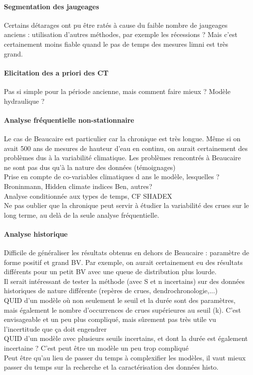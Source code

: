 	\paragraph{Segmentation des jaugeages} Certains détarages ont pu être ratés à cause du faible nombre de jaugeages anciens : utilisation d'autres méthodes, par exemple les récessions ? Mais c'est certainement moins fiable quand le pas de temps des mesures limni est très grand. 
	
	\paragraph{Elicitation des a priori des CT} Pas si simple pour la période ancienne, mais comment faire mieux ? Modèle hydraulique ?\\
	
	\paragraph{Analyse fréquentielle non-stationnaire}
	Le cas de Beaucaire est particulier car la chronique est très longue. Même si on avait 500 ans de mesures de hauteur d'eau en continu, on aurait certainement des problèmes dus à la variabilité climatique. Les problèmes rencontrés à Beaucaire ne sont pas dus qu'à la nature des données (témoignages)\\
	Prise en compte de co-variables climatiques d	ans le modèle, lesquelles ? \\
	Broninmann, Hidden climate indices Ben, autres? \\
	Analyse conditionnée aux types de temps, CF SHADEX\\
	Ne pas oublier que la chronique peut servir à étudier la variabilité des crues sur le long terme, au delà de la seule analyse fréquentielle.
	
	\paragraph{Analyse historique}
	Difficile de généraliser les résultats obtenus en dehors de Beaucaire : paramètre de forme positif et grand BV. Par exemple, on aurait certainement eu des résultats différents pour un petit BV avec une queue de distribution plus lourde. \\
	Il serait intéressant de tester la méthode (avec S et n incertains) sur des données historiques de nature différente (repères de crues, dendrochronologie,...)\\
	QUID d'un modèle où non seulement le seuil et la durée sont des paramètres, mais également le nombre d'occurrences de crues supérieures au seuil (k). C'est envisageable et un peu plus compliqué, mais sûrement pas très utile vu l'incertitude que ça doit engendrer\\
	QUID d'un modèle avec plusieurs seuils incertains, et dont la durée est également incertaine ? C'est peut être un modèle un peu trop compliqué\\
	Peut être qu'au lieu de passer du temps à complexifier les modèles, il vaut mieux passer du temps sur la recherche et la caractérisation des données histo.
	
